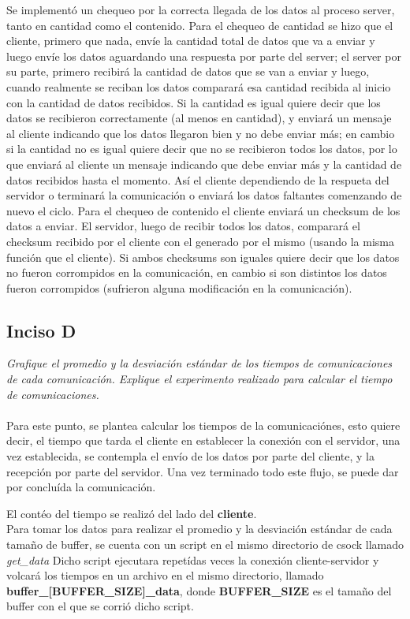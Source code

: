 \documentclass[12pt,journal,compsoc]{IEEEtran}
\begin{document}
Se implementó un chequeo por la correcta llegada de los datos al proceso server, tanto en cantidad como el contenido.
Para el chequeo de cantidad se hizo que el cliente, primero que nada, envíe la cantidad total de datos que va a enviar y luego envíe los datos aguardando una respuesta por parte del server; el server por su parte, primero recibirá la cantidad de datos que se van a enviar y luego, cuando realmente se reciban los datos comparará esa cantidad recibida al inicio con la cantidad de datos recibidos. Si la cantidad es igual quiere decir que los datos se recibieron correctamente (al menos en cantidad), y enviará un mensaje al cliente indicando que los datos llegaron bien y no debe enviar más; en cambio si la cantidad no es igual quiere decir que no se recibieron todos los datos, por lo que enviará al cliente un mensaje indicando que debe enviar más  y la cantidad de datos recibidos hasta el momento. Así el cliente dependiendo de la respueta del servidor o terminará la comunicación o enviará los datos faltantes comenzando de nuevo el ciclo.
Para el chequeo de contenido el cliente enviará un checksum de los datos a enviar. El servidor, luego de recibir todos los datos, comparará el checksum recibido por el cliente con el generado por el mismo (usando la misma función que el cliente). Si ambos checksums son iguales quiere decir que los datos no fueron corrompidos en la comunicación, en cambio si son distintos los datos fueron corrompidos (sufrieron alguna modificación en la comunicación).

\subsection{Inciso D}
\textit{Grafique el promedio y la desviación estándar de los tiempos de comunicaciones de cada
comunicación. Explique el experimento realizado para calcular el tiempo de
comunicaciones.}\\\\
Para este punto, se plantea calcular los tiempos de la comunicaciónes, esto quiere decir,
el tiempo que tarda el cliente en establecer la conexión con el servidor, una vez establecida,
se contempla el envío de los datos por parte del cliente, y la recepción por parte del servidor.
Una vez terminado todo este flujo, se puede dar por concluída la comunicación.

El contéo del tiempo se realizó del lado del \textbf{cliente}.\\
Para tomar los datos para realizar el promedio y la desviación estándar de cada tamaño de buffer,
se cuenta con un script en el mismo directorio de csock llamado \textit{get\_data}
Dicho script ejecutara repetídas veces la conexión cliente-servidor y volcará los tiempos en un archivo
en el mismo directorio, llamado \textbf{buffer\_[BUFFER\_SIZE]\_data}, donde \textbf{BUFFER\_SIZE} es el tamaño
del buffer con el que se corrió dicho script.
\end{document}
